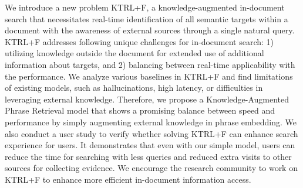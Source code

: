 We introduce a new problem KTRL+F, a knowledge-augmented in-document search that necessitates real-time identification of all semantic targets within a document with the awareness of external sources through a single natural query. KTRL+F addresses following unique challenges for in-document search: 1) utilizing knowledge outside the document for extended use of additional information about targets, and 2) balancing between real-time applicability with the performance. We analyze various baselines in KTRL+F and find limitations of existing models, such as hallucinations, high latency, or difficulties in leveraging external knowledge. Therefore, we propose a Knowledge-Augmented Phrase Retrieval model that shows a promising balance between speed and performance by simply augmenting external knowledge in phrase embedding. We also conduct a user study to verify whether solving KTRL+F can enhance search experience for users. It demonstrates that even with our simple model, users can reduce the time for searching with less queries and reduced extra visits to other sources for collecting evidence. We encourage the research community to work on KTRL+F to enhance more efficient in-document information access.